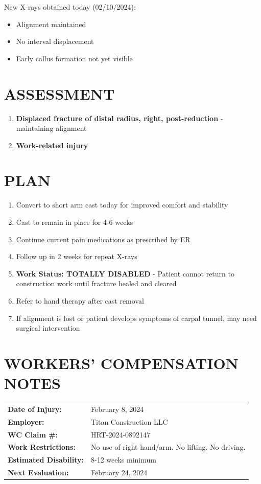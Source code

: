 \documentclass[11pt]{article}
\begin{document}
New X-rays obtained today (02/10/2024):
\begin{itemize}[nosep]
\item Alignment maintained
\item No interval displacement
\item Early callus formation not yet visible
\end{itemize}

\section*{ASSESSMENT}

\begin{enumerate}
\item \textbf{Displaced fracture of distal radius, right, post-reduction} - maintaining alignment
\item \textbf{Work-related injury}
\end{enumerate}

\section*{PLAN}

\begin{enumerate}
\item Convert to short arm cast today for improved comfort and stability
\item Cast to remain in place for 4-6 weeks
\item Continue current pain medications as prescribed by ER
\item Follow up in 2 weeks for repeat X-rays
\item \textbf{Work Status: TOTALLY DISABLED} - Patient cannot return to construction work until fracture healed and cleared
\item Refer to hand therapy after cast removal
\item If alignment is lost or patient develops symptoms of carpal tunnel, may need surgical intervention
\end{enumerate}

\section*{WORKERS' COMPENSATION NOTES}

\begin{tabular}{@{}p{5cm}p{9cm}@{}}
\textbf{Date of Injury:} & February 8, 2024 \\
\textbf{Employer:} & Titan Construction LLC \\
\textbf{WC Claim \#:} & HRT-2024-0892147 \\
\textbf{Work Restrictions:} & No use of right hand/arm. No lifting. No driving. \\
\textbf{Estimated Disability:} & 8-12 weeks minimum \\
\textbf{Next Evaluation:} & February 24, 2024 \\
\end{tabular}
\end{document}
